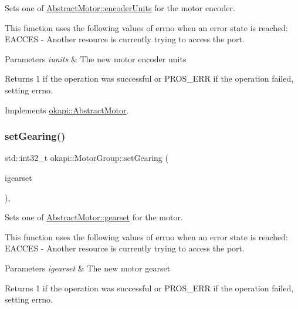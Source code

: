 Sets one of \mbox{\hyperlink{classokapi_1_1AbstractMotor_ae811cd825099f2defadeb1b7f7e7764c}{Abstract\+Motor\+::encoder\+Units}} for the motor encoder.

This function uses the following values of errno when an error state is reached\+: E\+A\+C\+C\+ES -\/ Another resource is currently trying to access the port.


\begin{DoxyParams}{Parameters}
{\em iunits} & The new motor encoder units \\
\hline
\end{DoxyParams}
\begin{DoxyReturn}{Returns}
1 if the operation was successful or {\ttfamily P\+R\+O\+S\+\_\+\+E\+RR} if the operation failed, setting errno. 
\end{DoxyReturn}


Implements \mbox{\hyperlink{classokapi_1_1AbstractMotor_aae559b72399b0eb2124d969e40f97415}{okapi\+::\+Abstract\+Motor}}.

\mbox{\label{classokapi_1_1MotorGroup_a5720f3775594f0097856754776526a47}} 
\subsubsection{\texorpdfstring{setGearing()}{setGearing()}}
{\footnotesize\ttfamily std\+::int32\+\_\+t okapi\+::\+Motor\+Group\+::set\+Gearing (\begin{DoxyParamCaption}\item[{\mbox{\hyperlink{classokapi_1_1AbstractMotor_a88aaa6ea2fa10f5520a537bbf26774d5}{Abstract\+Motor\+::gearset}}}]{igearset }\end{DoxyParamCaption})\hspace{0.3cm}{\ttfamily [override]}, {\ttfamily [virtual]}}

Sets one of \mbox{\hyperlink{classokapi_1_1AbstractMotor_a88aaa6ea2fa10f5520a537bbf26774d5}{Abstract\+Motor\+::gearset}} for the motor.

This function uses the following values of errno when an error state is reached\+: E\+A\+C\+C\+ES -\/ Another resource is currently trying to access the port.


\begin{DoxyParams}{Parameters}
{\em igearset} & The new motor gearset \\
\hline
\end{DoxyParams}
\begin{DoxyReturn}{Returns}
1 if the operation was successful or {\ttfamily P\+R\+O\+S\+\_\+\+E\+RR} if the operation failed, setting errno. 
\end{DoxyReturn}


